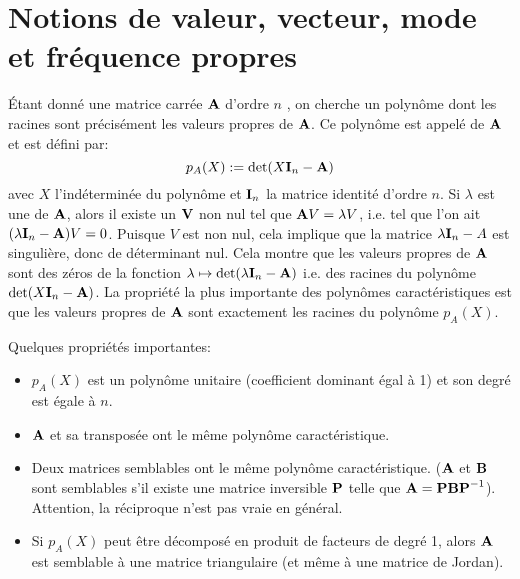\medskip
\section{Notions de valeur, vecteur, mode et fréquence propres}

\medskip
Étant donné une matrice carrée $\MM{A}$ d'ordre $n$ , 
on cherche un polynôme dont les racines sont précisément les valeurs propres de $\MM{A}$.
Ce polynôme est appelé  
de $\MM{A}$ et est défini par:
\begin{equation} p_A(X):=\det(X\MM{I}_n-\MM{A})\end{equation}
avec $X$ l'indéterminée du polynôme et $\MM{I}_n$ la matrice identité d'ordre $n$.
\medskipvm
Si $\lambda$ est une  de $\MM{A}$, alors il existe un 
 $\VV{V}$ non nul tel que $\MM{A}V = \lambda V$, i.e. 
tel que l'on ait $(\lambda \MM{I}_n-\MM{A})V = 0$.
\medskipvm
Puisque $V$ est non nul, cela implique que la matrice $\lambda \MM{I}_n-A$ est singulière, donc de déterminant nul. 
\medskipvm
Cela montre que les valeurs propres de $\MM{A}$ sont des zéros de la fonction $\lambda\mapsto \det(\lambda \MM{I}_n - \MM{A})$
i.e. des racines du polynôme $\det(X\MM{I}_n-\MM{A})$.
\medskipvm
La propriété la plus importante des polynômes caractéristiques est que 
les valeurs propres de $\MM{A}$ sont exactement les racines du polynôme $p_A(X)$. 

\medskip
Quelques propriétés importantes:
\begin{itemize}
   \item $p_A(X)$ est un polynôme unitaire (coefficient dominant égal à 1) et son degré 
	est égale à $n$.
   \item $\MM{A}$ et sa transposée ont le même polynôme caractéristique.
   \item Deux matrices semblables ont le même polynôme caractéristique. ($\MM{A}$ et $\MM{B}$ sont semblables s'il 
	existe une matrice inversible $\MM{P}$ telle que $\MM{A} = \MM{PBP}^{-1}$).
	Attention, la réciproque n'est pas vraie en général.
   \item Si $p_A(X)$ peut être décomposé en produit de facteurs de degré 1, alors $\MM{A}$ est semblable
	à une matrice triangulaire (et même à une matrice de Jordan).
\end{itemize}


